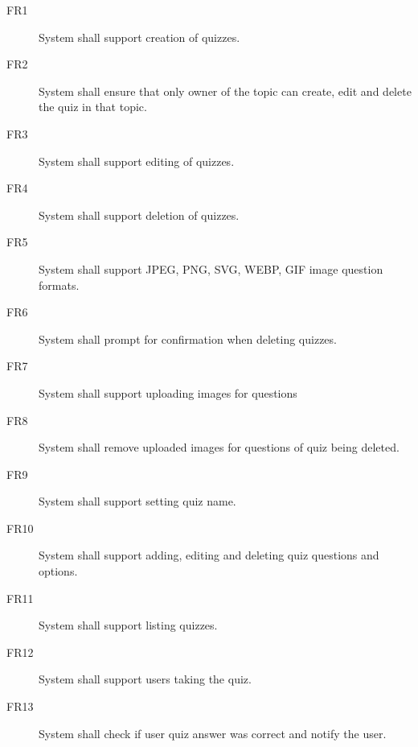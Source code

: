 \documentclass[
    english, %
]{VUMIFPSkursinis}
\begin{document}
\begin{description}
    \item[FR1] System shall support creation of quizzes.
    \item[FR2] System shall ensure that only owner of the topic can create, edit and delete the quiz in that topic.
    \item[FR3] System shall support editing of quizzes.
    \item[FR4] System shall support deletion of quizzes.
    \item[FR5] System shall support JPEG, PNG, SVG, WEBP, GIF image question formats.
    \item[FR6] System shall prompt for confirmation when deleting quizzes.
    \item[FR7] System shall support uploading images for questions
    \item[FR8] System shall remove uploaded images for questions of quiz being deleted.
    \item[FR9] System shall support setting quiz name.
    \item[FR10] System shall support adding, editing and deleting quiz questions and options.
    \item[FR11] System shall support listing quizzes.
    \item[FR12] System shall support users taking the quiz.
    \item[FR13] System shall check if user quiz answer was correct and notify the user.
\end{description}

\listoffigures
\printbibliography[heading=bibintoc]
\end{document}
